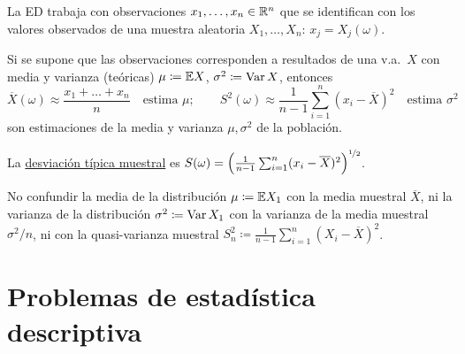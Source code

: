 La ED trabaja con observaciones $x_1, \dots, x_n \in \mathbb{R}^n$ que se identifican con los valores observados de una muestra aleatoria $X_1, \dots, X_n$: $x_j = X_j(\omega)$.

Si se supone que las observaciones corresponden a resultados de una v.a.\ $X$ con media y varianza (teóricas) $\mu \coloneqq \mathbb{E} X$, $\sigma^2 \coloneqq \operatorname{Var} X$, entonces
\[
  \overline{X}(\omega) \approx \frac{x_1 + \dots + x_n}{n} \quad \text{estima } \mu; \qquad S^2(\omega) \approx \frac{1}{n-1}\sum_{i=1}^n (x_i - \overline{X})^2 \quad \text{estima } \sigma^2
\]
son estimaciones de la media y varianza $\mu, \sigma^2$ de la población.

La \underline{desviación típica muestral} es $S(\omega) = \left(\frac{1}{n-1}\sum_{i=1}^n (x_i - \overline{X})^2\right)^{\nicefrac{1}{2}}$.

\begin{observacion}[7]
No confundir la media de la distribución $\mu \coloneqq \mathbb{E} X_1$ con la media muestral $\overline{X}$, ni la varianza de la distribución $\sigma^2 \coloneqq \operatorname{Var} X_1$ con la varianza de la media muestral $\sigma^2/n$, ni con la quasi-varianza muestral $S_n^2 \coloneqq \frac{1}{n-1}\sum_{i=1}^n (X_i - \overline{X})^2$.
\end{observacion}

\section{Problemas de estadística descriptiva}

